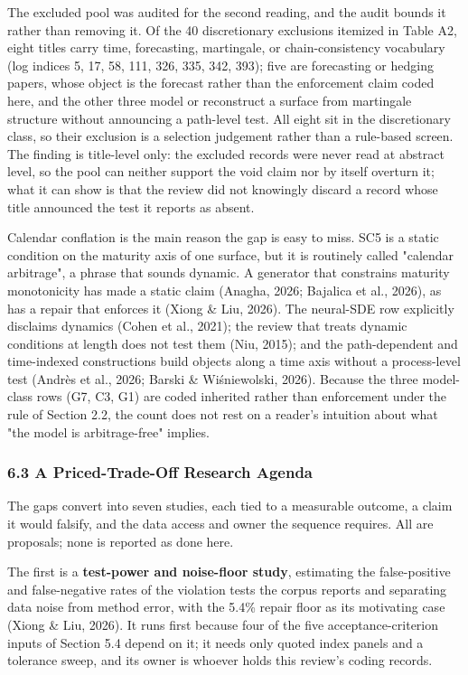 \documentclass[11pt]{article}
\begin{document}
The excluded pool was audited for the second reading, and the audit bounds it rather than removing it. Of the 40 discretionary exclusions itemized in Table A2, eight titles carry time, forecasting, martingale, or chain-consistency vocabulary (log indices 5, 17, 58, 111, 326, 335, 342, 393); five are forecasting or hedging papers, whose object is the forecast rather than the enforcement claim coded here, and the other three model or reconstruct a surface from martingale structure without announcing a path-level test. All eight sit in the discretionary class, so their exclusion is a selection judgement rather than a rule-based screen. The finding is title-level only: the excluded records were never read at abstract level, so the pool can neither support the void claim nor by itself overturn it; what it can show is that the review did not knowingly discard a record whose title announced the test it reports as absent.

Calendar conflation is the main reason the gap is easy to miss. SC5 is a static condition on the maturity axis of one surface, but it is routinely called "calendar arbitrage", a phrase that sounds dynamic. A generator that constrains maturity monotonicity has made a static claim (Anagha, 2026; Bajalica et al., 2026), as has a repair that enforces it (Xiong \& Liu, 2026). The neural-SDE row explicitly disclaims dynamics (Cohen et al., 2021); the review that treats dynamic conditions at length does not test them (Niu, 2015); and the path-dependent and time-indexed constructions build objects along a time axis without a process-level test (Andrès et al., 2026; Barski \& Wiśniewolski, 2026). Because the three model-class rows (G7, C3, G1) are coded inherited rather than enforcement under the rule of Section 2.2, the count does not rest on a reader's intuition about what "the model is arbitrage-free" implies.

\subsubsection*{6.3 A Priced-Trade-Off Research Agenda}
The gaps convert into seven studies, each tied to a measurable outcome, a claim it would falsify, and the data access and owner the sequence requires. All are proposals; none is reported as done here.

The first is a \textbf{test-power and noise-floor study}, estimating the false-positive and false-negative rates of the violation tests the corpus reports and separating data noise from method error, with the 5.4\% repair floor as its motivating case (Xiong \& Liu, 2026). It runs first because four of the five acceptance-criterion inputs of Section 5.4 depend on it; it needs only quoted index panels and a tolerance sweep, and its owner is whoever holds this review's coding records.
\end{document}
